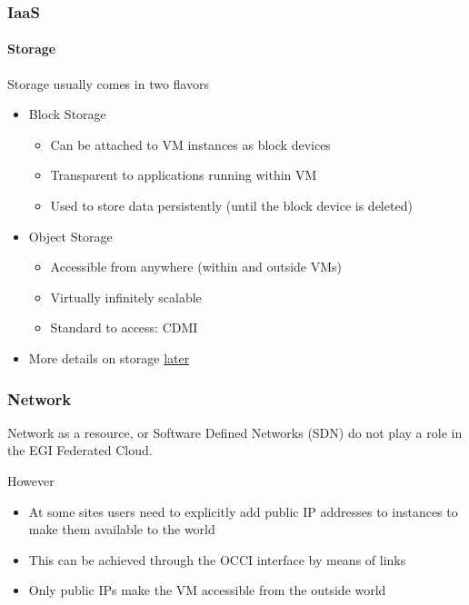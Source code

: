 \begin{frame}
\frametitle{IaaS}
\framesubtitle{Storage}
Storage usually comes in two flavors
\begin{itemize}
\item Block Storage
  \begin{itemize}
  \item Can be attached to VM instances as block devices
  \item Transparent to applications running within VM
  \item Used to store data persistently (until the block device is deleted)
  \end{itemize}
\item Object Storage
  \begin{itemize}
  \item Accessible from anywhere (within and outside VMs)
  \item Virtually infinitely scalable
  \item Standard to access: CDMI
  \end{itemize}
\item More details on storage \hyperlink{part_storage}{later}
\end{itemize}
\end{frame}

\begin{frame}
\frametitle{Network}
Network as a resource, or Software Defined Networks (SDN) do not play
a role in the EGI Federated Cloud.

\vspace{1em}
However
\begin{itemize}
\item At some sites users need to explicitly add public IP addresses
  to instances to make them available to the world
\item This can be achieved through the OCCI interface by means of links
\item Only public IPs make the VM accessible from the outside world
\end{itemize}
\end{frame}


